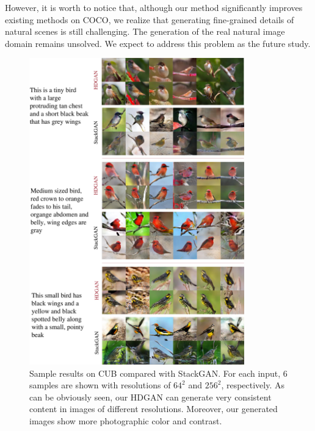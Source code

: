 \documentclass[10pt, letterpaper]{article}
\begin{document}
However, it is worth to notice that, although our method significantly improves existing methods \cite{han2017stackgan,reed2016generative} on COCO, we realize that generating fine-grained details of natural scenes is still challenging. The  generation of the real natural image domain remains unsolved. We expect to address this problem as the future study. 



\newpage


\begin{figure}[th!]
	\centering
	\includegraphics[width=0.83\textwidth]{figure/supp_bird2.pdf}
	
	\caption{Sample results on CUB compared with StackGAN. For each input, 6 samples are shown with resolutions of $64^2$ and $256^2$, respectively. As can be obviously seen, our HDGAN can generate very consistent content in images of different resolutions. Moreover, our generated images show more photographic color and contrast.  }  
	\label{fig:bird2}
\end{figure}
\end{document}
